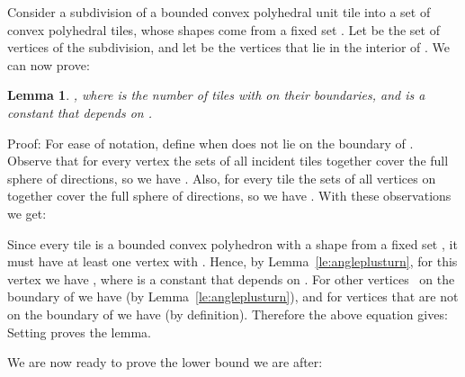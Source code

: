 \documentclass[11pt,a4paper]{article}
\newtheorem{lemma}{Lemma}
\newenvironment{proof}{Proof:}{\qed}
\def\squareforqed{\hbox{\rlap{}}}
\def\qed{\ifmmode\squareforqed\else{\unskip\nobreak\hfil
\penalty50\hskip1em\null\nobreak\hfil\squareforqed
\parfillskip=0pt\finalhyphendemerits=0\endgraf}\fi}
\begin{document}
Consider a subdivision of a bounded convex polyhedral unit tile  into a set  of convex polyhedral tiles, whose shapes come from a fixed set . Let  be the set of vertices of the subdivision, and let  be the vertices that lie in the interior of . We can now prove:
\begin{lemma}\label{le:3dvertextileincidences}
, where  is the number of tiles with  on their boundaries, and  is a constant that depends on .
\end{lemma}
\begin{proof}
For ease of notation, define  when  does not lie on the boundary of . Observe that for every vertex  the sets  of all incident tiles  together cover the full sphere of directions, so we have . Also, for every tile  the sets  of all vertices  on  together cover the full sphere of directions, so we have . With these observations we get:

Since every tile  is a bounded convex polyhedron with a shape from a fixed set , it must have at least one vertex  with . Hence, by Lemma~\ref{le:angleplusturn}, for this vertex  we have , where  is a constant that depends on . For other vertices~ on the boundary of  we have  (by Lemma~\ref{le:angleplusturn}), and for vertices  that are not on the boundary of  we have  (by definition). Therefore the above equation gives:
Setting  proves the lemma.
\end{proof}

We are now ready to prove the lower bound we are after:
\end{document}
